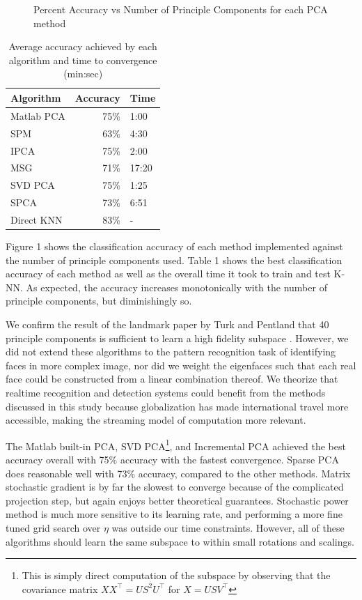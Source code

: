 \documentclass[11pt,letterpaper]{article}
\begin{document}
\begin{figure}
\begin{tabular}{cccc}
\end{tabular}
\caption{\fontsize{10}{11}Percent Accuracy vs Number of Principle Components for each PCA method}
\end{figure}


\begin{table}
\begin{center}
\begin{tabular}{|l|rl|}
\hline \bf \fontsize{10}{11}Algorithm & \bf Accuracy & \bf Time\\ \hline
\fontsize{10}{11}Matlab PCA & 75\% & 1:00 \\
\fontsize{10}{11}SPM & 63\% & 4:30 \\
\fontsize{10}{11}IPCA & 75\%  &  2:00 \\
\fontsize{10}{11}MSG & 71\%  &   17:20 \\
\fontsize{10}{11}SVD PCA & 75\% & 1:25 \\
\fontsize{10}{11}SPCA & 73\% & 6:51  \\
\fontsize{10}{11}Direct KNN & 83\%  &   - \\

\hline
\end{tabular}
\end{center}
\caption{\label{font-table} Average accuracy achieved by each algorithm and time to convergence (min:sec)}
\end{table}
Figure 1 shows the classification accuracy of each method implemented against the number of principle components used. Table 1 shows the best classification accuracy of each method as well as the overall time it took to train and test K-NN. As expected, the accuracy increases monotonically with the number of principle components, but diminishingly so. 

 We confirm the result of the landmark paper by Turk and Pentland that 40 principle components is sufficient to learn a high fidelity subspace \cite{turk}. However, we did not extend these algorithms to the pattern recognition task of identifying faces in more complex image, nor did we weight the eigenfaces such that each real face could be constructed from a linear combination thereof. We theorize that realtime recognition and detection systems could benefit from the methods discussed in this study because globalization has made international travel more accessible, making the streaming model of computation more relevant. 

The Matlab built-in PCA, SVD PCA\footnote{This is simply direct computation of the subspace by observing that the covariance matrix $XX^{\top} = US^2U^\top$ for $X = USV^\top$}, and Incremental PCA achieved the best accuracy overall with 75\% accuracy with the fastest convergence. Sparse PCA does reasonable well with 73\% accuracy, compared to the other methods. Matrix stochastic gradient is by far the slowest to converge because of the complicated projection step, but again enjoys better theoretical guarantees. Stochastic power method is much more sensitive to its learning rate, and performing a more fine tuned grid search over $\eta$ was outside our time constraints. However, all of these algorithms should learn the same subspace to within small rotations and scalings. 
\end{document}
